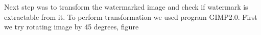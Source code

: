\documentclass[a4paper, 12pt]{article}
\begin{document}
        \begin{figure}[!h]%
			\centering
			\qquad
			\label{fig:python_logo2}%
		\end{figure}

        
    	Next step was to transform the watermarked image and check if watermark is extractable from it. To perform transformation we used program GIMP2.0. First we try rotating image by 45 degrees, figure %

        \begin{figure}[h]%
			\centering
			\qquad
			\label{fig:45}%
		\end{figure}
\end{document}
